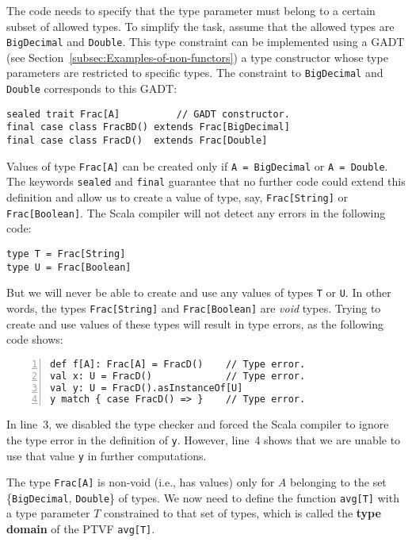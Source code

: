 The code needs to specify that the type parameter must belong to a
certain subset of allowed types. To simplify the task, assume that
the allowed types are \lstinline!BigDecimal! and \lstinline!Double!.
This type constraint can be implemented using a GADT 
(see Section~\ref{subsec:Examples-of-non-functors}) \textemdash{}
a type constructor whose type parameters are restricted to specific
types. The constraint to \lstinline!BigDecimal! and \lstinline!Double!
corresponds to this GADT:
\begin{lstlisting}
sealed trait Frac[A]          // GADT constructor.
final case class FracBD() extends Frac[BigDecimal]
final case class FracD()  extends Frac[Double]
\end{lstlisting}
Values of type \lstinline!Frac[A]! can be created only if \lstinline!A = BigDecimal!
or \lstinline!A = Double!. The keywords \lstinline!sealed! and \lstinline!final!
guarantee that no further code could extend this definition and allow
us to create a value of type, say, \lstinline!Frac[String]! or \lstinline!Frac[Boolean]!.
The Scala compiler will not detect any errors in the following code:
\begin{lstlisting}
type T = Frac[String]
type U = Frac[Boolean]
\end{lstlisting}
But we will never be able to create and use any values of types \lstinline!T!
or \lstinline!U!. In other words, the types \lstinline!Frac[String]!
and \lstinline!Frac[Boolean]! are \emph{void} types.
Trying to create and use values of these types will result in type
errors, as the following code shows:
\begin{lstlisting}[numbers=left]
def f[A]: Frac[A] = FracD()    // Type error.
val x: U = FracD()             // Type error.
val y: U = FracD().asInstanceOf[U]
y match { case FracD() => }    // Type error.
\end{lstlisting}
In line~3, we disabled the type checker and forced the Scala compiler
to ignore the type error in the definition of \lstinline!y!. However,
line~4 shows that we are unable to use that value \lstinline!y!
in further computations.

The type \lstinline!Frac[A]! is non-void (i.e., has values) only
for $A$ belonging to the set \{\lstinline!BigDecimal!, \lstinline!Double!\}
of types. We now need to define the function \lstinline!avg[T]! with
a type parameter $T$ constrained to that set of types, which is called
the \textbf{type domain} of the PTVF \lstinline!avg[T]!. 

